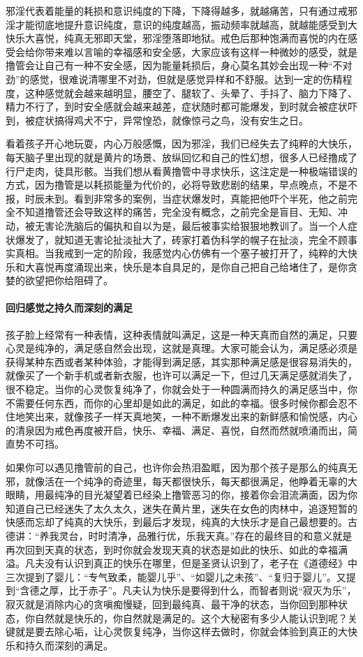 邪淫代表着能量的耗损和意识纯度的下降，下降得越多，就越痛苦，只有通过戒邪淫才能彻底地提升意识纯度，意识的纯度越高，振动频率就越高，就越能感受到大快乐大喜悦，纯真无邪即天堂，邪淫堕落即地狱。戒色后那种饱满而喜悦的内在感受会给你带来难以言喻的幸福感和安全感，大家应该有这样一种微妙的感受，就是撸管会让自己有一种不安全感，因为能量耗损后，身心莫名其妙会出现一种“不对劲”的感觉，很难说清哪里不对劲，但就是感觉异样和不舒服。达到一定的伤精程度，这种感觉就会越来越明显，腰空了、腿软了、头晕了、手抖了、脑力下降了、精力不行了，到时安全感就会越来越差，症状随时都可能爆发，到时就会被症状吓到，被症状搞得鸡犬不宁，异常惶恐，就像惊弓之鸟，没有安生之日。

看着孩子开心地玩耍，内心万般感慨，因为邪淫，我们已经失去了纯粹的大快乐，每天脑子里出现的就是黄片的场景、放纵回忆和自己的性幻想，很多人已经撸成了行尸走肉，徒具形骸。当我们想从看黄撸管中寻求快乐，这注定是一种极端错误的方式，因为撸管是以耗损能量为代价的，必将导致悲剧的结果，早点晚点，不是不报，时辰未到。看到非常多的案例，当症状爆发时，真能把他吓个半死，他之前完全不知道撸管还会导致这样的痛苦，完全没有概念，之前完全是盲目、无知、冲动，被无害论洗脑后的偏执和自以为是，最后被事实给狠狠地教训了。当一个人症状爆发了，就知道无害论扯淡扯大了，砖家打着伪科学的幌子在扯淡，完全不顾事实真相。当我戒到一定的阶段，我感觉内心仿佛有一个塞子被打开了，纯粹的大快乐和大喜悦再度涌现出来，快乐是本自具足的，是你自己把自己给堵住了，是你贪婪的欲望把你给阻碍了。

\paragraph{回归感觉之持久而深刻的满足}

孩子脸上经常有一种表情，这种表情就叫满足，这是一种天真而自然的满足，只要心灵是纯净的，满足感自然会出现，这就是真理。大家可能会认为，满足感必须是获得某种东西或者某种体验，才能得到满足感，其实那种满足感是很容易消失的，就像买了一个新手机或者新衣服，也许可以满足一下，但过几天满足感就消失了，很不稳定。当你的心灵恢复纯净了，你就会处于一种圆满而持久的满足感当中，你不需要任何东西，而你的心里却是如此的满足，如此的幸福。很多时候你都会忍不住地笑出来，就像孩子一样天真地笑，一种不断爆发出来的新鲜感和愉悦感，内心的清泉因为戒色再度被开启，快乐、幸福、满足、喜悦，自然而然就喷涌而出，简直势不可挡。

如果你可以遇见撸管前的自己，也许你会热泪盈眶，因为那个孩子是那么的纯真无邪，就像活在一个纯净的奇迹里，每天都很快乐，每天都很满足，他睁着无辜的大眼睛，用最纯净的目光凝望着已经染上撸管恶习的你，接着你会泪流满面，因为你知道自己已经迷失了太久太久，迷失在黄片里，迷失在女色的肉林中，追逐短暂的快感而忘却了纯真的大快乐，到最后才发现，纯真的大快乐才是自己最想要的。古德讲：“养我灵台，时时清净，品雅行优，乐我天真。”存在的最终目的和意义就是再次回到天真的状态，到时你就会发现天真的状态是如此的快乐、如此的幸福满溢。凡夫没有认识到真正的快乐在哪里，但是圣贤认识到了，老子在《道德经》中三次提到了婴儿：“专气致柔，能婴儿乎”、“如婴儿之未孩”、“复归于婴儿”。又提到“含德之厚，比于赤子”。凡夫认为快乐是要得到什么，而智者则说“寂灭为乐”，寂灭就是消除内心的贪嗔痴慢疑，回到最纯真、最干净的状态，当你回到那种状态，你自然就是快乐的，你自然就是满足的。这个大秘密有多少人能认识到呢？关键就是要去除心垢，让心灵恢复纯净，当你这样去做时，你就会体验到真正的大快乐和持久而深刻的满足。

